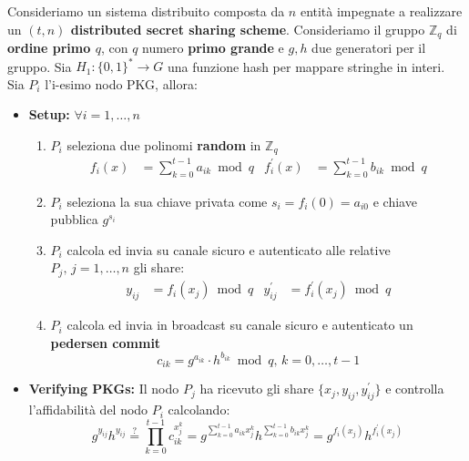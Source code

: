 \begin{definition}\label{def:dpkg}
    Consideriamo un sistema distribuito composta da $n$ entità impegnate a realizzare un \textbf{$(t,n)$ distributed secret sharing scheme}.
    Consideriamo il gruppo $\mathbb{Z}_q$ di \textbf{ordine primo $q$}, con $q$ numero \textbf{primo grande} e $g,h$ due generatori per il gruppo. Sia $H_1:\{0,1\}^*\rightarrow G$ una funzione hash per mappare stringhe in interi.\\
    Sia $P_i$ l'i-esimo nodo PKG, allora:
    \begin{itemize}
        \item \textbf{Setup:} $\forall i=1,\dots,n$ 
        \begin{enumerate}
            \item $P_i$ seleziona due polinomi \textbf{random} in $\mathbb{Z}_q$
            \begin{equation*}
                \begin{aligned}
                    f_i(x)&=\sum_{k=0}^{t-1}a_{ik}\bmod{q}&
                    f_i^\prime(x)&=\sum_{k=0}^{t-1}b_{ik}\bmod{q}
                \end{aligned}
            \end{equation*}
            \item $P_i$ seleziona la sua chiave privata come $s_i=f_i(0)=a_{i0}$ e chiave pubblica $g^{s_i}$
            \item $P_i$ calcola ed invia su canale sicuro e autenticato alle relative $P_j,\,j=1,\dots,n$ gli share:
            \begin{equation*}
                \begin{aligned}
                    y_{ij}&=f_i(x_j)\bmod{q}&
                    y_{ij}^\prime&=f_i^\prime(x_j)\bmod{q}
                \end{aligned}
            \end{equation*}
            \item $P_i$ calcola ed invia in broadcast su canale sicuro e autenticato un \textbf{pedersen commit}
            \[
            c_{ik}=g^{a_{ik}}\cdot h^{b_{ik}}\bmod{q},\,k=0,\dots,t-1
            \]
        \end{enumerate}
        \item \textbf{Verifying PKGs:} Il nodo $P_j$ ha ricevuto gli share $\{x_j,y_{ij},y_{ij}^\prime\}$ e controlla l'affidabilità del nodo $P_i$ calcolando:
        \[
        g^{y_{ij}}h^{y_{ij}}\stackrel{?}{=}\prod_{k=0}^{t-1}c_{ik}^{x_j^k}=g^{\sum_{k=0}^{t-1}a_{ik}x_{j}^k}h^{\sum_{k=0}^{t-1}b_{ik}x_j^k}=g^{f_i(x_j)}h^{f_i^\prime(x_j)}
\]
\end{itemize}
\end{definition}
